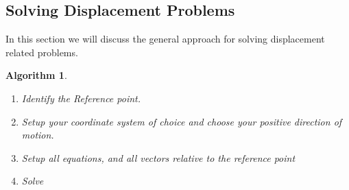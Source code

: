\documentclass[12pt]{article}
\theoremstyle{break}
\newtheorem{algo}[thm]{Algorithm}
\begin{document}
\newpage

\subsection{Solving Displacement Problems}
In this section we will discuss the general approach for solving displacement related problems.
\begin{algo}
    \begin{enumerate}
        \item Identify the Reference point.
        \item Setup your coordinate system of choice \emph{and} choose your positive direction of motion.
        \item Setup all equations, and all vectors relative to the \emph{reference point}
        \item Solve
    \end{enumerate}
\end{algo}
\end{document}
